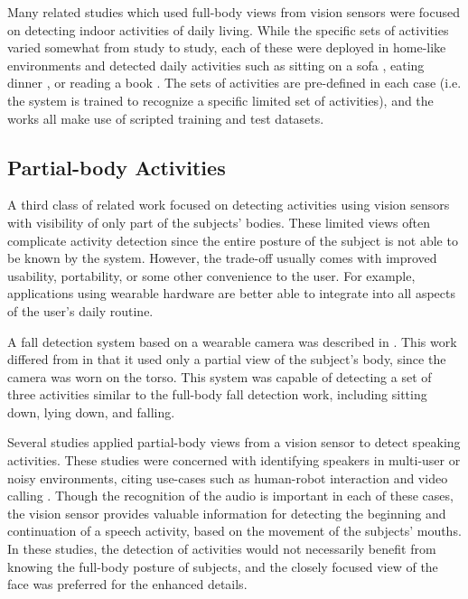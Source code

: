\documentclass[12pt]{report}
\begin{document}
Many related studies which used full-body views from vision sensors were focused on detecting indoor activities of daily living. While the specific sets of activities varied somewhat from study to study, each of these were deployed in home-like environments and detected daily activities such as sitting on a sofa \cite{Figueroa-Angulo2013}, eating dinner \cite{Yao2016}, or reading a book \cite{ElHelw2009}. The sets of activities are pre-defined in each case (i.e. the system is trained to recognize a specific limited set of activities), and the works all make use of scripted training and test datasets. 

\subsection{Partial-body Activities}

A third class of related work focused on detecting activities using vision sensors with visibility of only part of the subjects’ bodies. These limited views often complicate activity detection since the entire posture of the subject is not able to be known by the system. However, the trade-off usually comes with improved usability, portability, or some other convenience to the user. For example, applications using wearable hardware are better able to integrate into all aspects of the user's daily routine.

A fall detection system based on a wearable camera was described in \cite{Mahabalagiri2013}. This work differed from \cite{Banerjee2014} in that it used only a partial view of the subject’s body, since the camera was worn on the torso. This system was capable of detecting a set of three activities similar to the full-body fall detection work, including sitting down, lying down, and falling.

Several studies applied partial-body views from a vision sensor to detect speaking activities. These studies were concerned with identifying speakers in multi-user or noisy environments, citing use-cases such as human-robot interaction \cite{Yoshida2010, Lim2009} and video calling \cite{Savran2018}. Though the recognition of the audio is important in each of these cases, the vision sensor provides valuable information for detecting the beginning and continuation of a speech activity, based on the movement of the subjects’ mouths. In these studies, the detection of activities would not necessarily benefit from knowing the full-body posture of subjects, and the closely focused view of the face was preferred for the enhanced details.
\end{document}
